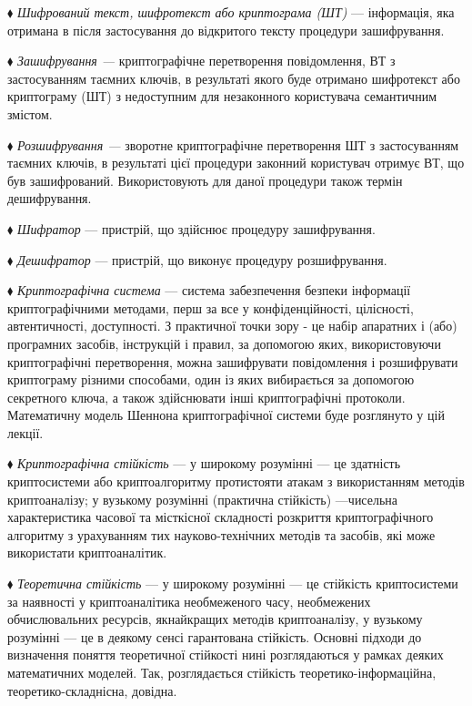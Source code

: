 ${\blacklozenge}$ \textit{Шифрований текст, шифротекст  або криптограма (ШТ)} ---
інформація, яка отримана в після застосування до відкритого тексту процедури
зашифрування.

${\blacklozenge}$ \textit{Зашифрування --- }криптографічне перетворення
повідомлення, ВТ з застосуванням таємних ключів, в результаті якого буде
отримано \textit{ }шифротекст  або криптограму (ШТ) з недоступним для
незаконного користувача семантичним змістом.

${\blacklozenge}$ \textit{Розшифрування --- }зворотне \textit{ }криптографічне
перетворення ШТ з застосуванням таємних ключів, в результаті цієї процедури
законний користувач отримує ВТ, що був зашифрований.  Використовують для даної
процедури також термін дешифрування.

${\blacklozenge}$ \textit{Шифратор }--- пристрій, що здійснює процедуру
зашифрування.

${\blacklozenge}$ \textit{Дешифратор }--- пристрій, що виконує процедуру
розшифрування.

${\blacklozenge}$ \textit{Криптографічна система }--- система забезпечення безпеки
інформації криптографічними методами, перш за все у конфіденційності,
цілісності, автентичності, доступності. З практичної точки зору -  це набір
апаратних і (або) програмних засобів, інструкцій і правил, за допомогою яких,
використовуючи криптографічні перетворення, можна зашифрувати  повідомлення і
розшифрувати криптограму різними способами, один із яких вибирається за
допомогою секретного ключа, а також здійснювати інші криптографічні протоколи.
Математичну модель Шеннона криптографічної системи буде розглянуто у цій
лекції.

${\blacklozenge}$ \textit{Криптографічна стійкість }--- у широкому розумінні --- це
здатність криптосистеми або криптоалгоритму протистояти атакам з використанням
методів криптоаналізу; у вузькому розумінні (практична стійкість) ---чисельна
характеристика часової та місткісної складності розкриття криптографічного
алгоритму з урахуванням тих науково-технічних методів та засобів, які може
використати криптоаналітик.

${\blacklozenge}$ \textit{Теоретична стійкість }---  у широкому розумінні --- це
стійкість криптосистеми за наявності у криптоаналітика необмеженого часу,
необмежених обчислювальних ресурсів, якнайкращих методів криптоаналізу, у
вузькому розумінні --- це в деякому сенсі гарантована стійкість. Основні підходи
до визначення поняття теоретичної стійкості нині розглядаються у рамках деяких
математичних моделей. Так, розглядається стійкість теоретико-інформаційна,
теоретико-складнісна, довідна. 

